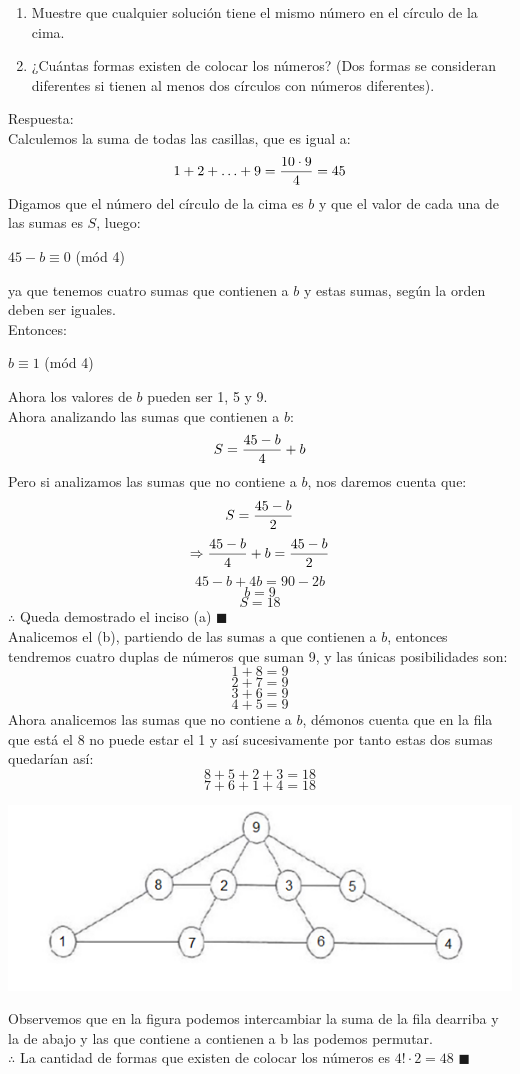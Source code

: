 \documentclass{book}
\begin{document}
\begin{enumerate}
\begin{enumerate}
						 \item Muestre que cualquier solución tiene el mismo número en el círculo de la cima.
						 \item ¿Cuántas formas existen de colocar los números? (Dos formas se consideran diferentes si tienen al menos dos círculos con números diferentes).
						 \end{enumerate}
						 Respuesta:\\
Calculemos la suma de todas las casillas, que es igual a:
$$1+2+\ldots +9={10\cdot 9\over 4}=45$$
Digamos que el número del círculo de la cima es $b$ y que el valor de cada una de las sumas es $S$, luego:
\begin{center}
$45-b\equiv 0$ (mód 4)
\end{center}
ya que tenemos cuatro sumas que contienen a $b$ y estas sumas, según la orden deben ser iguales.\\
Entonces:
\begin{center}
$b\equiv 1$ (mód 4)
\end{center}
Ahora los valores de $b$ pueden ser 1, 5 y 9.\\
Ahora analizando las sumas que contienen a $b$:
$$S={45-b\over 4}+b$$
Pero si analizamos las sumas que no contiene a $b$, nos daremos cuenta que:
$$S={45-b\over 2}$$
$$\Rightarrow {45-b\over 4}+b={45-b\over 2}$$
$$45-b+4b=90-2b$$
$$b=9$$
$$S=18$$
$\therefore$ Queda demostrado el inciso (a) $\blacksquare$\\
Analicemos el (b), partiendo de las sumas a que contienen a $b$, entonces tendremos cuatro duplas de números que suman 9, y las únicas posibilidades son:
$$1+8=9$$
$$2+7=9$$
$$3+6=9$$
$$4+5=9$$
Ahora analicemos las sumas que no contiene a $b$, démonos cuenta que en la fila que está el 8 no puede estar el 1 y así sucesivamente por tanto estas dos sumas quedarían así:
$$8+5+2+3=18$$
$$7+6+1+4=18$$
							\begin{center}
								\includegraphics[scale=1]{imagenes/Combinatoria/1,2.png}
							\end{center}
Observemos que en la figura podemos intercambiar la suma de la fila dearriba y la de abajo y las que contiene a contienen a b las podemos permutar.\\
$\therefore$ La cantidad de formas que existen de colocar los números es $4!\cdot 2=48$ $\blacksquare$\\
							

\end{enumerate}
\end{document}
